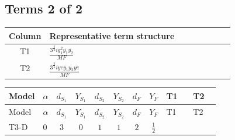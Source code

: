 \documentclass[8pt]{article}
\begin{document}
\begin{landscape}
\subsection*{Terms 2 of 2}
\begin{center}
\begin{tabular}{@{}c >{\raggedright\arraybackslash}p{0.82\linewidth}@{}}
\toprule
Column & Representative term structure \\
\midrule
T1 & \(\displaystyle \frac{3^{\frac{3}{4}} i g_{1}^{2} \overline{y_{1}} \overline{y_{2}}}{MF}\) \\
\midrule
T2 & \(\displaystyle \frac{3^{\frac{3}{4}} i ye \overline{y_{1}} \overline{y_{2}} \overline{ye}}{MF}\) \\
\midrule
\bottomrule
\end{tabular}
\end{center}
\smallskip
\tiny
\begin{longtable}{@{}llcccccc >{\raggedright\arraybackslash}p{0.21\linewidth} >{\raggedright\arraybackslash}p{0.21\linewidth}@{}}
\toprule
Model & $\alpha$ & $d_{S_1}$ & $Y_{S_1}$ & $d_{S_2}$ & $Y_{S_2}$ & $d_F$ & $Y_F$ & T1 & T2 \\
\midrule
\endfirsthead
\toprule
Model & $\alpha$ & $d_{S_1}$ & $Y_{S_1}$ & $d_{S_2}$ & $Y_{S_2}$ & $d_F$ & $Y_F$ & T1 & T2 \\
\midrule
\endhead
T3-D & $0$ & $3$ & $0$ & $1$ & $1$ & $2$ & $\frac{1}{2}$ & \scriptsize\adjustbox{max width=\linewidth}{$\begin{gathered} - \frac{3^{\frac{3}{4}} i g_{1}^{2} \overline{y_{1}} \overline{y_{2}}}{8 MF}\end{gathered}$} & \scriptsize\adjustbox{max width=\linewidth}{$\begin{gathered} \frac{3^{\frac{3}{4}} i ye \overline{y_{1}} \overline{y_{2}} \overline{ye}}{12 MF}\end{gathered}$} \\
\midrule
\bottomrule
\end{longtable}
\end{landscape}
\end{document}
